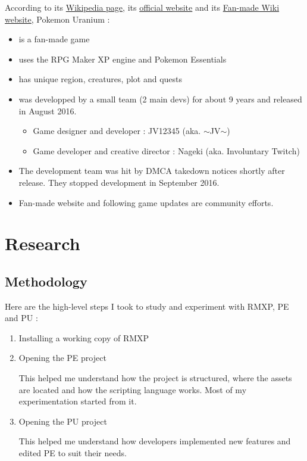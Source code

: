\documentclass[11pt]{article}
\begin{document}
According to its \href{https://en.wikipedia.org/wiki/Pok\%C3\%A9mon_Uranium}{Wikipedia page}, its \href{http://pokemonuranium.org/}{official website} and its \href{https://pokemon-uranium.fandom.com/wiki/Main_Page}{Fan-made Wiki website}, Pokemon Uranium :
\begin{itemize}
	\item is a fan-made game
	\item uses the RPG Maker XP engine and Pokemon Essentials
	\item has unique region, creatures, plot and quests
	\item was developped by a small team (2 main devs) for about 9 years and released in August 2016.
	\begin{itemize}
		\item Game designer and developer : JV12345 (aka. $\sim$JV$\sim$)
		\item Game developer and creative director : Nageki (aka. Involuntary Twitch)
	\end{itemize}
	\item The development team was hit by DMCA takedown notices shortly after release. They stopped development in September 2016.
	\item Fan-made website and following game updates are community efforts.
\end{itemize}



\newpage
\section{Research}

\subsection{Methodology}

Here are the high-level steps I took to study and experiment with RMXP, PE and PU :
\begin{enumerate}
	\item Installing a working copy of RMXP

	\item Opening the PE project
	
	This helped me understand how the project is structured, where the assets are located and how the scripting language works. Most of my experimentation started from it.
	
	\item Opening the PU project
	
	This helped me understand how developers implemented new features and edited PE to suit their needs.
\end{enumerate}
\end{document}
